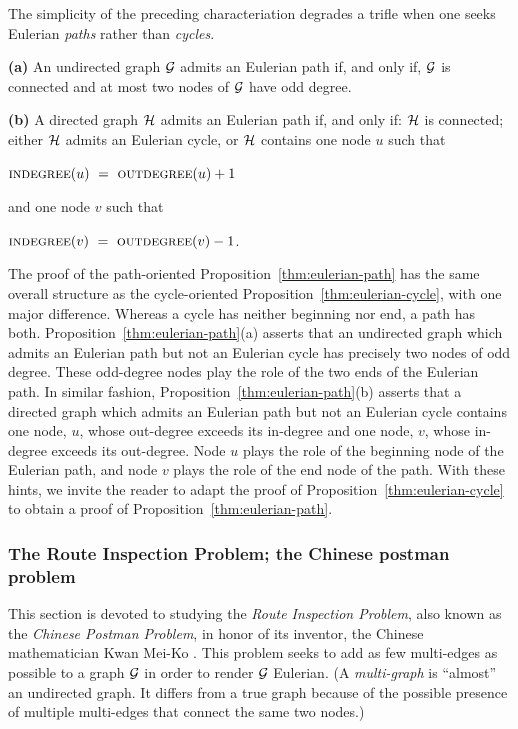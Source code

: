 The simplicity of the preceding characteriation degrades a trifle when
one seeks Eulerian {\em paths} rather than {\em cycles}.

\begin{prop}
\label{thm:eulerian-path}
{\bf (a)}
An undirected graph $\mbox{$\cal G$}$ admits an Eulerian path if, and only if,
$\mbox{$\cal G$}$ is connected and at most two nodes of $\mbox{$\cal G$}$ have odd degree.

{\bf (b)}
A directed graph $\mbox{$\cal H$}$ admits an Eulerian path if, and only if: $\mbox{$\cal H$}$ is
connected; either $\mbox{$\cal H$}$ admits an Eulerian cycle, or $\mbox{$\cal H$}$ contains one
node $u$ such that

\hspace*{.5in}$\mbox{\sc indegree}(u) \ = \ \mbox{\sc outdegree}(u) +1$

\noindent
and one node $v$ such that

\hspace*{.5in}$\mbox{\sc indegree}(v) \ = \ \mbox{\sc outdegree}(v) -1$.
\end{prop}

The proof of the path-oriented Proposition~\ref{thm:eulerian-path} has
the same overall structure as the cycle-oriented
Proposition~\ref{thm:eulerian-cycle}, with one major difference.
Whereas a cycle has neither beginning nor end, a path has both.
Proposition~\ref{thm:eulerian-path}(a) asserts that an undirected
graph which admits an Eulerian path but not an Eulerian cycle has
precisely two nodes of odd degree.  These odd-degree nodes play the
role of the two ends of the Eulerian path.  In similar fashion,
Proposition~\ref{thm:eulerian-path}(b) asserts that a directed graph
which admits an Eulerian path but not an Eulerian cycle contains one
node, $u$, whose out-degree exceeds its in-degree and one node, $v$,
whose in-degree exceeds its out-degree.  Node $u$ plays the role of
the beginning node of the Eulerian path, and node $v$ plays the role
of the end node of the path.  With these hints, we invite the reader
to adapt the proof of Proposition~\ref{thm:eulerian-cycle} to obtain a
proof of Proposition~\ref{thm:eulerian-path}.

\subsubsection{The Route Inspection Problem; the Chinese postman problem}
\label{sec:chinesePostman}

This section is devoted to studying the {\it Route Inspection
  Problem},  also known as the {\it
  Chinese Postman Problem},  in honor
of its inventor, the Chinese mathematician Kwan Mei-Ko  \cite{Kwan60}.  This problem seeks to add as few multi-edges
 as possible to a graph $\mbox{$\cal G$}$ in
order to render $\mbox{$\cal G$}$ Eulerian.  (A {\it multi-graph} is ``almost'' an
undirected graph.  It differs from a true graph because of the
possible presence of multiple multi-edges that connect the same two
nodes.)

